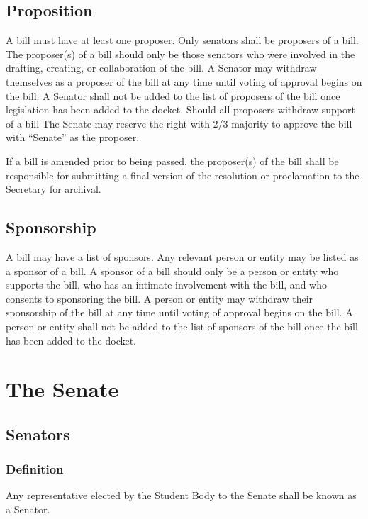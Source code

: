 \documentclass[12pt]{scrreprt}
\begin{document}
\section{Proposition}
A bill must have at least one proposer. Only senators shall be proposers of a bill. The proposer(s) of a bill should only be those senators who were involved in the drafting, creating, or collaboration of the bill. A Senator may withdraw themselves as a proposer of the bill at any time until voting of approval begins on the bill. A Senator shall not be added to the list of proposers of the bill once legislation has been added to the docket. Should all proposers withdraw support of a bill The Senate may reserve the right with 2/3 majority to approve the bill with “Senate” as the proposer.

If a bill is amended prior to being passed, the proposer(s) of the bill shall be responsible for
submitting a final version of the resolution or proclamation to the Secretary for archival.

\section{Sponsorship}
A bill may have a list of sponsors. Any relevant person or entity may be listed as a sponsor of a bill. A sponsor of a bill should only be a person or entity who supports the bill, who has an intimate involvement with the bill, and who consents to sponsoring the bill. A person or entity may withdraw their sponsorship of the bill at any time until voting of approval begins on the bill. A person or entity shall not be added to the list of sponsors of the bill once the bill has been added to the docket.


\chapter{The Senate}

\section{Senators}
\subsection{Definition}
Any representative elected by the Student Body to the Senate shall be known as a Senator.
\end{document}
